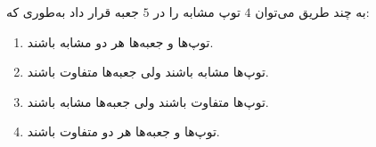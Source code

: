 \EXERCISE
به چند طریق می‌توان
$4$
توپ مشابه را در
$5$
جعبه قرار داد به‌طوری که:
\begin{enumerate}
\item
توپ‌ها و جعبه‌ها هر دو مشابه باشند.
\item
توپ‌ها مشابه باشند ولی جعبه‌ها متفاوت باشند.
\item
توپ‌ها متفاوت باشند ولی جعبه‌ها مشابه باشند.
\item
توپ‌ها و جعبه‌ها هر دو متفاوت باشند.
\end{enumerate}